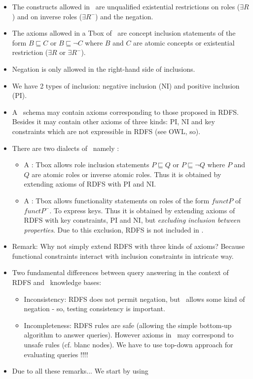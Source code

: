 \begin{itemize}
\item The constructs allowed in \dl\ are unqualified existential restrictions on roles ($\exists R$)  and on inverse roles ($\exists R^{-}$) and the negation.
\item The axioms allowed in a Tbox of \dl\ are concept inclusion statements of the form $B \sqsubseteq C $  or  $B \sqsubseteq \neg C $ where $B$ and $C$ are atomic concepts
or existential  restriction ($\exists R$ or $\exists R^{-}$).
\item Negation is only allowed in the right-hand side of inclusions.
\item We have 2 types of inclusion:  negative inclusion (NI) and positive inclusion (PI).
\item A \dl\ schema may contain axioms corresponding to those proposed in RDFS. Besides it may contain other axioms of three kinds:
PI, NI and key constraints which are not expressible in RDFS (see OWL, so).


\item There are two dialects of \dl\, namely : 

\begin{itemize}
\item A \dlr: Tbox allows role inclusion statements $P \sqsubseteq Q $  or  $P \sqsubseteq \neg Q$ where $P$ and $Q$ are atomic  roles or inverse atomic roles. Thus it is obtained
by extending axioms of RDFS with PI and NI.
\item A \dlf:  Tbox allows functionality statements on roles of the form $funct P$ of $funct P^-$. To express keys.
Thus it is obtained by extending axioms of RDFS with key constraints, PI and NI, but \textit{excluding inclusion between properties}. Due to this exclusion, RDFS is not included in \dlf.
\end{itemize}

\item Remark: Why not simply extend RDFS with three kinds of axioms? Because functional constraints interact with inclusion constraints in intricate way.

\item Two fundamental differences between query answering in the context of RDFS and \dl\ knowledge bases:
\begin{itemize}
\item Inconsistency:  RDFS does not permit negation, but \dl\ allows some kind of negation - so, testing consistency is important.
\item Incompleteness: RDFS rules are safe (allowing the simple bottom-up algorithm to answer queries). However axioms in \dl\ may correspond to unsafe rules (cf. blanc nodes). We have to use top-down approach for evaluating queries !!!! 
\end{itemize}

\item Due to all these remarks... We start by using \dlr
\end{itemize}

